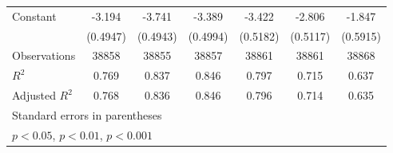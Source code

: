 {\begin{tabular}{l*{6}{c}}
\addlinespace
Constant            &      -3.194\sym{***}&      -3.741\sym{***}&      -3.389\sym{***}&      -3.422\sym{***}&      -2.806\sym{***}&      -1.847\sym{**} \\
                    &    (0.4947)         &    (0.4943)         &    (0.4994)         &    (0.5182)         &    (0.5117)         &    (0.5915)         \\
\midrule
Observations        &       38858         &       38855         &       38857         &       38861         &       38861         &       38868         \\
\(R^{2}\)           &       0.769         &       0.837         &       0.846         &       0.797         &       0.715         &       0.637         \\
Adjusted \(R^{2}\)  &       0.768         &       0.836         &       0.846         &       0.796         &       0.714         &       0.635         \\
\bottomrule
\multicolumn{7}{l}{\footnotesize Standard errors in parentheses}\\
\multicolumn{7}{l}{\footnotesize \sym{*} \(p<0.05\), \sym{**} \(p<0.01\), \sym{***} \(p<0.001\)}\\
\end{tabular}
}

